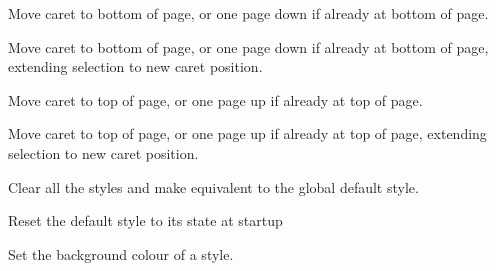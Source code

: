 \label{wxstyledtextctrlstutteredpagedown}


Move caret to bottom of page, or one page down if already at bottom of page.


\label{wxstyledtextctrlstutteredpagedownextend}


Move caret to bottom of page, or one page down if already at bottom of page, extending selection to new caret position.


\label{wxstyledtextctrlstutteredpageup}


Move caret to top of page, or one page up if already at top of page.


\label{wxstyledtextctrlstutteredpageupextend}


Move caret to top of page, or one page up if already at top of page, extending selection to new caret position.


\label{wxstyledtextctrlstyleclearall}


Clear all the styles and make equivalent to the global default style.


\label{wxstyledtextctrlstyleresetdefault}


Reset the default style to its state at startup


\label{wxstyledtextctrlstylesetbackground}


Set the background colour of a style.


\label{wxstyledtextctrlstylesetbold}


